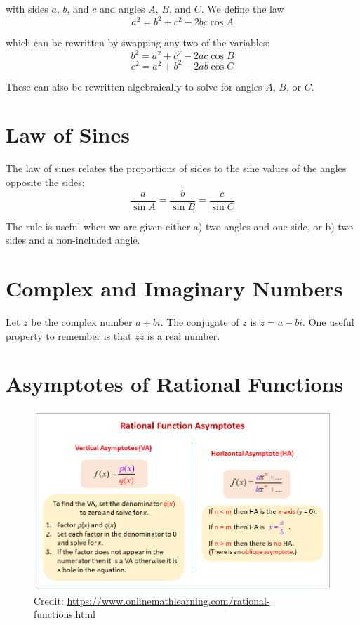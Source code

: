 \documentclass[12pt]{article}
\begin{document}
with sides \(a\), \(b\), and \(c\) and angles \(A\), \(B\), and \(C\). We define the law\\

\[a^2=b^2+c^2-2bc\cos A\]

which can be rewritten by swapping any two of the variables:\\

\[b^2=a^2+c^2-2ac\cos B\]
\[c^2=a^2+b^2-2ab\cos C\]

These can also be rewritten algebraically to solve for angles \(A\), \(B\), or \(C\).

\section{Law of Sines}

The law of sines relates the proportions of sides to the sine values of the angles opposite the sides:\\

\[\frac{a}{\sin A}=\frac{b}{\sin B}=\frac{c}{\sin C}\]

The rule is useful when we are given either a) two angles and one side, or b) two sides and a non-included angle.\\

\section{Complex and Imaginary Numbers}

Let \(z\) be the complex number \(a+bi\). The conjugate of \(z\) is \(\bar{z}=a-bi\). One useful property to remember is that \(z\bar{z}\) is a real number.

\section{Asymptotes of Rational Functions}

\begin{figure}[H]
	\centering
	\includegraphics[scale=.75]{rational.png}
	\caption{Credit: \url{https://www.onlinemathlearning.com/rational-functions.html}}
\end{figure}
\end{document}
